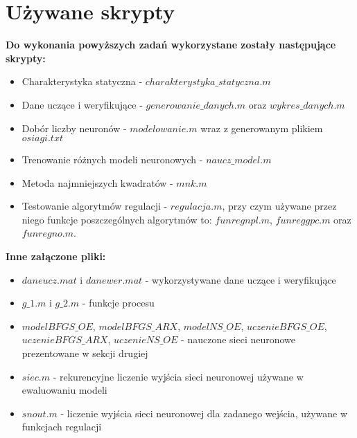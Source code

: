 \chapter{Używane skrypty}
	\textbf{Do wykonania powyższych zadań wykorzystane zostały następujące skrypty:}
	\begin{itemize}
		\item Charakterystyka statyczna - $charakterystyka\_statyczna.m$
		\item Dane uczące i weryfikujące - $generowanie\_danych.m$ oraz $wykres\_danych.m$
		\item Dobór liczby neuronów - $modelowanie.m$ wraz z generowanym plikiem $osiagi.txt$
		\item Trenowanie różnych modeli neuronowych - $naucz\_model.m$
		\item Metoda najmniejszych kwadratów - $mnk.m$
		\item Testowanie algorytmów regulacji - $regulacja.m$, przy czym używane przez niego funkcje poszczególnych algorytmów to: $funregnpl.m$, $funreggpc.m$ oraz $funregno.m$.
	\end{itemize}

	\textbf{Inne załączone pliki:}
	\begin{itemize}
		\item $daneucz.mat$ i $danewer.mat$ - wykorzystywane dane uczące i weryfikujące
		\item $g\_1.m$ i $g\_2.m$ - funkcje procesu
		\item $modelBFGS\_OE$, $modelBFGS\_ARX$, $modelNS\_OE$, $uczenieBFGS\_OE$, $uczenieBFGS\_ARX$, $uczenieNS\_OE$ - nauczone sieci neuronowe prezentowane w sekcji drugiej
		\item $siec.m$ - rekurencyjne liczenie wyjścia sieci neuronowej używane w ewaluowaniu modeli
		\item $snout.m$ - liczenie wyjścia sieci neuronowej dla zadanego wejścia, używane w funkcjach regulacji
	\end{itemize}